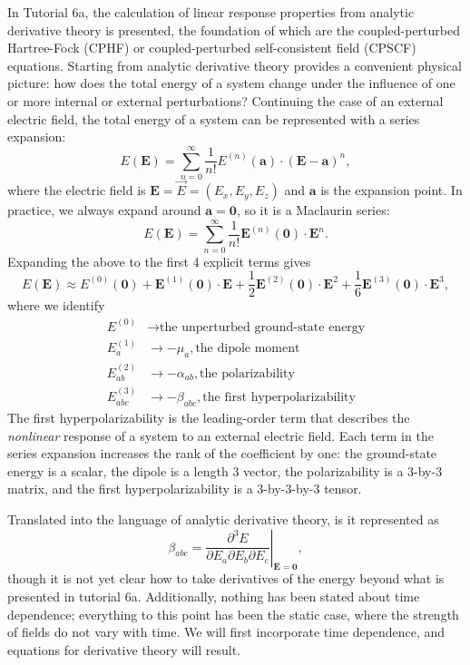 In Tutorial 6a, the calculation of linear response properties from analytic derivative theory is presented, the foundation of which are the coupled-perturbed Hartree-Fock (CPHF) or coupled-perturbed self-consistent field (CPSCF) equations. Starting from analytic derivative theory provides a convenient physical picture: how does the total energy of a system change under the influence of one or more internal or external perturbations? Continuing the case of an external electric field, the total energy of a system can be represented with a series expansion:
\begin{equation}
  E(\mathbf{E}) = \sum_{n=0}^{\infty} \frac{1}{n!}E^{(n)}(\mathbf{a})\cdot(\mathbf{E}-\mathbf{a})^{n},
\end{equation}
where the electric field is \(\mathbf{E} = \vec{E} = (E_x,E_y,E_z)\) and \(\mathbf{a}\) is the expansion point. In practice, we always expand around \(\mathbf{a} = \mathbf{0}\), so it is a Maclaurin series:
\begin{equation}
  E(\mathbf{E}) = \sum_{n=0}^{\infty} \frac{1}{n!}\mathbf{E}^{(n)}(\mathbf{0})\cdot\mathbf{E}^{n}.
\end{equation}
Expanding the above to the first 4 explicit terms gives
\begin{equation}
  E(\mathbf{E}) \approx E^{(0)}(\mathbf{0}) + \mathbf{E}^{(1)}(\mathbf{0})\cdot\mathbf{E} + \frac{1}{2}\mathbf{E}^{(2)}(\mathbf{0})\cdot\mathbf{E}^{2} + \frac{1}{6}\mathbf{E}^{(3)}(\mathbf{0})\cdot\mathbf{E}^{3},
\end{equation}
where we identify
\begin{align}
E^{(0)} &\rightarrow \textrm{the unperturbed ground-state energy} \\
E_{a}^{(1)} &\rightarrow -\mu_{a},\textrm{the dipole moment} \\
E_{ab}^{(2)} &\rightarrow -\alpha_{ab},\textrm{the polarizability} \\
E_{abc}^{(3)} &\rightarrow -\beta_{abc},\textrm{the first hyperpolarizability}
\end{align}
The first hyperpolarizability is the leading-order term that describes the \emph{nonlinear} response of a system to an external electric field.  Each term in the series expansion increases the rank of the coefficient by one: the ground-state energy is a scalar, the dipole is a length 3 vector, the polarizability is a 3-by-3 matrix, and the first hyperpolarizability is a 3-by-3-by-3 tensor.

Translated into the language of analytic derivative theory, is it represented as
\begin{equation}
  \beta_{abc} = \left.\frac{\partial^{3} E}{\partial E_a \partial E_b \partial E_c}\right|_{\mathbf{E}=\mathbf{0}},
\end{equation}
though it is not yet clear how to take derivatives of the energy beyond what is presented in tutorial 6a. Additionally, nothing has been stated about time dependence; everything to this point has been the static case, where the strength of fields do not vary with time. We will first incorporate time dependence, and equations for derivative theory will result.

